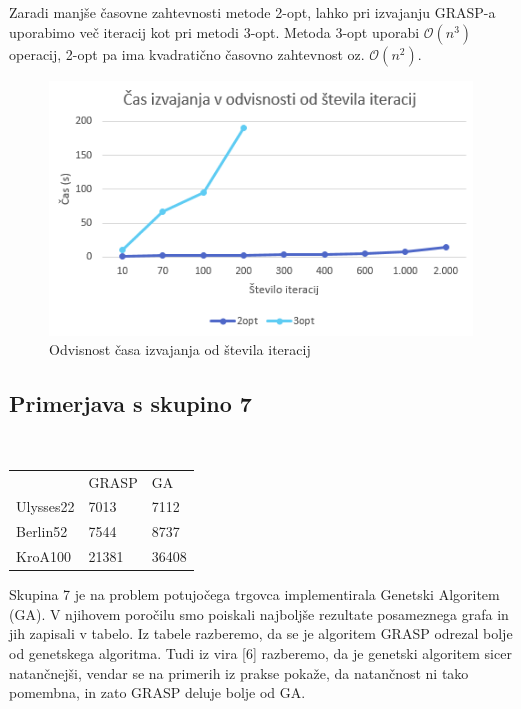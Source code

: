 \documentclass[12pt,a4paper]{amsart}
\theoremstyle{definition} %
\theoremstyle{plain} %
\begin{document}
Zaradi manjše časovne zahtevnosti metode 2-opt, lahko pri izvajanju GRASP-a uporabimo več iteracij kot pri metodi 3-opt. Metoda 3-opt uporabi $\mathcal{O}(n^3)$ operacij, 2-opt pa ima kvadratično časovno zahtevnost oz. $\mathcal{O}(n^2)$.

\begin{figure}[H]
\caption{Odvisnost časa izvajanja od števila iteracij}
\centering
\includegraphics[scale =0.8]{cas_izvajanja}
\end{figure}

\subsection{Primerjava s skupino 7} ~\\

\begin{table}[H]
\begin{tabular}{lll}
\rowcolor[HTML]{FFCCC9} 
          & GRASP & GA \\
Ulysses22 & 7013  & 7112               \\
Berlin52  & 7544  & 8737               \\
KroA100   & 21381 & 36408             
\end{tabular}
\end{table}

Skupina 7 je na problem potujočega trgovca implementirala Genetski Algoritem (GA). V njihovem poročilu smo poiskali najboljše rezultate posameznega grafa in jih zapisali v tabelo. Iz tabele razberemo, da se je algoritem GRASP odrezal bolje od genetskega algoritma.
Tudi iz vira [6] razberemo, da je genetski algoritem sicer natančnejši, vendar se na primerih iz prakse pokaže, da natančnost ni tako pomembna, in zato GRASP deluje bolje od GA.
\end{document}
